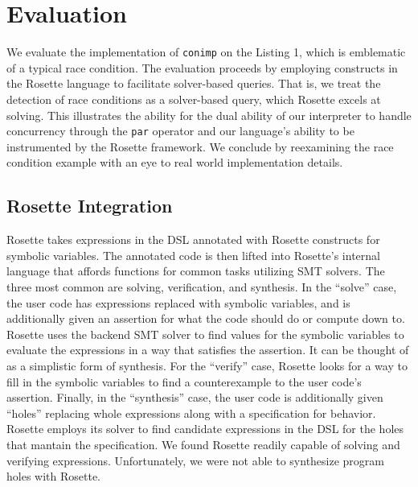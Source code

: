 \section{Evaluation}
We evaluate the implementation of \texttt{conimp} on the Listing 1, which is emblematic of a typical race condition.  The evaluation proceeds by employing constructs in the Rosette language to facilitate solver-based queries.  That is, we treat the detection of race conditions as a solver-based query, which Rosette excels at solving.  This illustrates the ability for the dual ability of our interpreter to handle concurrency through the \texttt{par} operator and our language's ability to be instrumented by the Rosette framework.  We conclude by reexamining the race condition example with an eye to real world implementation details.  

\subsection{Rosette Integration}
Rosette takes expressions in the DSL annotated with Rosette constructs for symbolic variables.  The annotated code is then lifted into Rosette's internal language that affords functions for common tasks utilizing SMT solvers.  The three most common are solving, verification, and synthesis.  In the ``solve'' case, the user code has expressions replaced with symbolic variables, and is additionally given an assertion for what the code should do or compute down to. Rosette uses the backend SMT solver to find values for the symbolic variables to evaluate the expressions in a way that satisfies the assertion.  It can be thought of as a simplistic form of synthesis.  For the ``verify'' case, Rosette looks for a way to fill in the symbolic variables to find a counterexample to the user code's assertion. Finally, in the ``synthesis'' case, the user code is additionally given ``holes'' replacing whole expressions along with a specification for behavior.  Rosette employs its solver to find candidate expressions in the DSL for the holes that mantain the specification.  We found Rosette readily capable of solving and verifying expressions.  Unfortunately, we were not able to synthesize program holes with Rosette.


